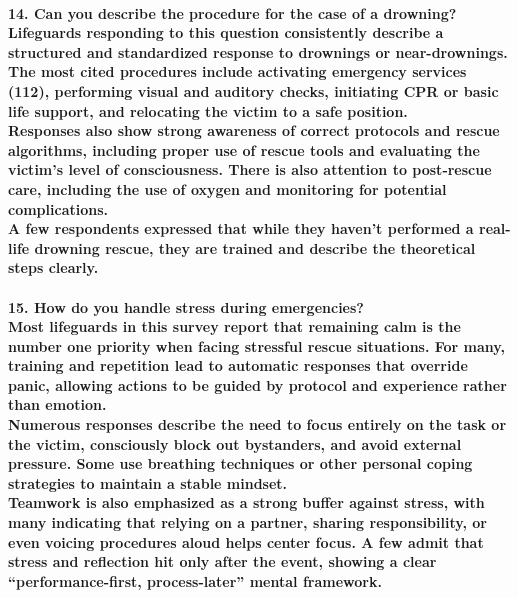 \paragraph{
\textbf{14. Can you describe the procedure for the case of a drowning?}
\\
Lifeguards responding to this question consistently describe a structured and standardized response to drownings or near-drownings. The most cited procedures include activating emergency services (112), performing visual and auditory checks, initiating CPR or basic life support, and relocating the victim to a safe position.
\\
Responses also show strong awareness of correct protocols and rescue algorithms, including proper use of rescue tools and evaluating the victim’s level of consciousness. There is also attention to post-rescue care, including the use of oxygen and monitoring for potential complications.
\\
A few respondents expressed that while they haven’t performed a real-life drowning rescue, they are trained and describe the theoretical steps clearly.}

\paragraph{
\textbf{15. How do you handle stress during emergencies?}
\\
Most lifeguards in this survey report that remaining calm is the number one priority when facing stressful rescue situations. For many, training and repetition lead to automatic responses that override panic, allowing actions to be guided by protocol and experience rather than emotion.
\\
Numerous responses describe the need to focus entirely on the task or the victim, consciously block out bystanders, and avoid external pressure. Some use breathing techniques or other personal coping strategies to maintain a stable mindset.
\\
Teamwork is also emphasized as a strong buffer against stress, with many indicating that relying on a partner, sharing responsibility, or even voicing procedures aloud helps center focus. A few admit that stress and reflection hit only after the event, showing a clear “performance-first, process-later” mental framework.}

